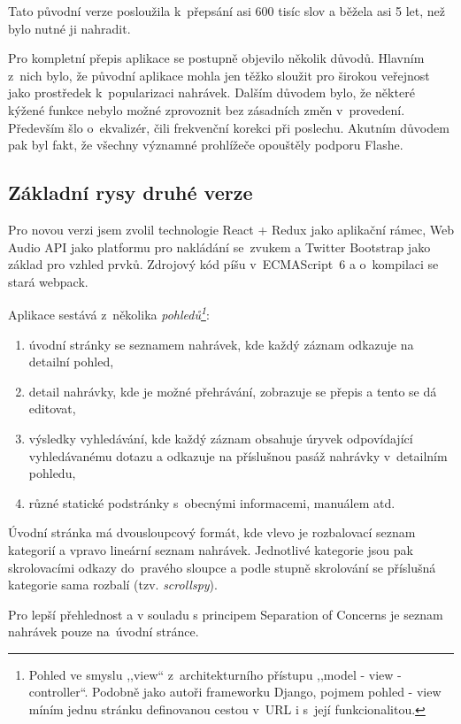 Tato původní verze posloužila k~přepsání asi 600 tisíc slov a běžela asi 5 let,
než bylo nutné ji nahradit.

Pro kompletní přepis aplikace se postupně objevilo několik důvodů. Hlavním
z~nich bylo, že původní aplikace mohla jen těžko sloužit pro širokou veřejnost
jako prostředek k~popularizaci nahrávek. Dalším důvodem bylo, že některé kýžené
funkce nebylo možné zprovoznit bez zásadních změn v~provedení. Především šlo
o~ekvalizér, čili frekvenční korekci při poslechu. Akutním důvodem pak byl fakt,
že všechny významné prohlížeče opouštěly podporu Flashe.

\subsection{Základní rysy druhé verze}

Pro novou verzi jsem zvolil technologie React + Redux\cite{abramov2015redux} jako aplikační rámec, Web
Audio API\cite{adenot2013web} jako platformu pro nakládání se~zvukem a Twitter Bootstrap jako základ
pro vzhled prvků. Zdrojový kód píšu v~ECMAScript~6 a o~kompilaci se stará
webpack.

Aplikace sestává z~několika {\em pohledů\footnote{Pohled ve smyslu ,,view``
z~architekturního přístupu ,,model - view - controller``. Podobně jako autoři
frameworku Django, pojmem pohled - view míním jednu stránku definovanou cestou
v~URL i s~její funkcionalitou.}}:
\begin{enumerate}
\item{úvodní stránky se seznamem nahrávek, kde každý záznam odkazuje na detailní
pohled,}
\item{detail nahrávky, kde je možné přehrávání, zobrazuje se přepis a tento se dá
editovat,}
\item{výsledky vyhledávání, kde každý záznam obsahuje úryvek odpovídající
vyhledávanému dotazu a odkazuje na příslušnou pasáž nahrávky v~detailním
pohledu,}
\item{různé statické podstránky s~obecnými informacemi, manuálem atd.}
\end{enumerate}

Úvodní stránka má
dvousloupcový formát, kde vlevo je rozbalovací seznam kategorií a vpravo
lineární seznam nahrávek. Jednotlivé kategorie jsou pak skrolovacími odkazy
do~pravého sloupce a podle stupně skrolování se příslušná kategorie sama
rozbalí (tzv. {\em scrollspy}).

Pro lepší přehlednost a v souladu s principem Separation of Concerns je seznam
nahrávek pouze na~úvodní stránce.

